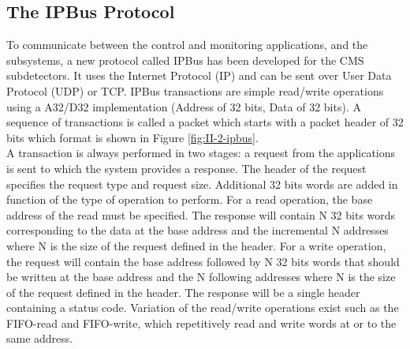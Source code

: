     \subsection{The IPBus Protocol}
    \label{sec:II-2-ipbus}

      To communicate between the control and monitoring applications, and the subsystems, a new protocol called IPBus has been developed for the CMS subdetectors. It uses the Internet Protocol (IP) and can be sent over User Data Protocol (UDP) or TCP. IPBus transactions are simple read/write operations using a A32/D32 implementation (Address of 32 bits, Data of 32 bits). A sequence of transactions is called a packet which starts with a packet header of 32 bits which format is shown in Figure \ref{fig:II-2-ipbus}. \\

      A transaction is always performed in two stages: a request from the applications is sent to which the system provides a response. The header of the request specifies the request type and request size. Additional 32 bits words are added in function of the type of operation to perform. For a read operation, the base address of the read must be specified. The response will contain N 32 bits words corresponding to the data at the base address and the incremental N addresses where N is the size of the request defined in the header. For a write operation, the request will contain the base address followed by N 32 bits words that should be written at the base address and the N following addresses where N is the size of the request defined in the header. The response will be a single header containing a status code. Variation of the read/write operations exist such as the FIFO-read and FIFO-write, which repetitively read and write words at or to the same address. \\

